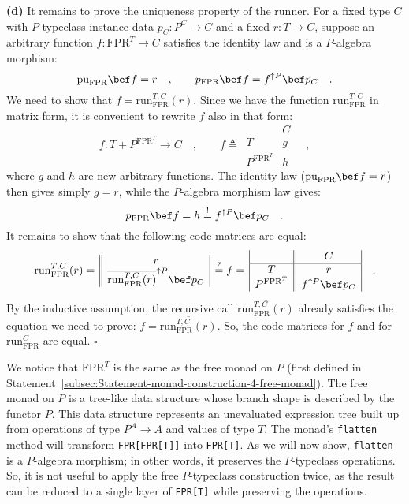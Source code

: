 \textbf{(d)} It remains to prove the uniqueness property of the runner.
For a fixed type $C$ with $P$-typeclass instance data $p_{C}:P^{C}\rightarrow C$
and a fixed $r:T\rightarrow C$, suppose an arbitrary function $f:\text{FPR}^{T}\rightarrow C$
satisfies the identity law and is a $P$-algebra morphism:
\[
\text{pu}_{\text{FPR}}\bef f=r\quad,\quad\quad p_{\text{FPR}}\bef f=f^{\uparrow P}\bef p_{C}\quad.
\]
We need to show that $f=\text{run}_{\text{FPR}}^{T,C}(r)$. Since
we have the function $\text{run}_{\text{FPR}}^{T,C}$ in matrix form,
it is convenient to rewrite $f$ also in that form:
\[
f:T+P^{\text{FPR}^{T}}\rightarrow C\quad,\quad\quad f\triangleq\,\begin{array}{|c||c|}
 & C\\
\hline T & g\\
P^{\text{FPR}^{T}} & h
\end{array}\quad,
\]
where $g$ and $h$ are new arbitrary functions. The identity law
($\text{pu}_{\text{FPR}}\bef f=r$) then gives simply $g=r$, while
the $P$-algebra morphism law gives:
\[
p_{\text{FPR}}\bef f=h\overset{!}{=}f^{\uparrow P}\bef p_{C}\quad.
\]
It remains to show that the following code matrices are equal:
\[
\text{run}_{\text{FPR}}^{T,C}(r)=\,\begin{array}{||c|}
r\\
\overline{\text{run}_{\text{FPR}}^{T,C}(r)}^{\uparrow P}\bef p_{C}
\end{array}\,\overset{?}{=}f=\,\begin{array}{|c||c|}
 & C\\
\hline T & r\\
P^{\text{FPR}^{T}} & f^{\uparrow P}\bef p_{C}
\end{array}\quad.
\]
By the inductive assumption, the recursive call $\overline{\text{run}_{\text{FPR}}^{T,C}(r)}$
already satisfies the equation we need to prove: $f=\overline{\text{run}_{\text{FPR}}^{T,C}(r)}$.
So, the code matrices for $f$ and for $\text{run}_{\text{FPR}}^{C}$
are equal. $\square$

We notice that $\text{FPR}^{T}$ is the same as the free monad
on $P$ (first defined in Statement~\ref{subsec:Statement-monad-construction-4-free-monad}).
The free monad on $P$ is a tree-like data structure whose branch
shape is described by the functor $P$. This data structure represents
an unevaluated expression tree built up from operations of type $P^{A}\rightarrow A$
and values of type $T$. The monad\textsf{'}s \lstinline!flatten!
method will transform \lstinline!FPR[FPR[T]]!
into \lstinline!FPR[T]!.
As we will now show, \lstinline!flatten!
is a $P$-algebra morphism; in other words, it preserves the $P$-typeclass
operations. So, it is not useful to apply the free $P$-typeclass
construction twice, as the result can be reduced to a single layer
of \lstinline!FPR[T]! while
preserving the operations.

